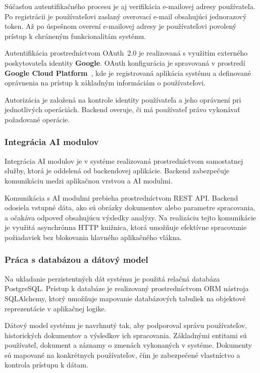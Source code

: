 Súčasťou autentifikačného procesu je aj verifikácia e-mailovej adresy
používateľa. Po registrácii je používateľovi zaslaný overovací e-mail
obsahujúci jednorazový token. Až po úspešnom overení e-mailovej adresy
je používateľovi povolený prístup k chráneným funkcionalitám systému.

Autentifikácia prostredníctvom OAuth~2.0 je realizovaná s využitím
externého poskytovateľa identity \textbf{Google}. OAuth konfigurácia
je spravovaná v prostredí \textbf{Google Cloud Platform}~\cite{gcp_oauth},
kde je registrovaná aplikácia systému a definované oprávnenia na prístup
k základným informáciám o používateľovi.

Autorizácia je založená na kontrole identity používateľa a jeho oprávnení
pri jednotlivých operáciách. Backend overuje, či má používateľ právo
vykonávať požadované operácie.

\subsubsection{Integrácia AI modulov}

Integrácia AI modulov je v systéme realizovaná prostredníctvom samostatnej
služby, ktorá je oddelená od backendovej aplikácie. Backend zabezpečuje komunikáciu medzi
aplikačnou vrstvou a AI modulmi.

Komunikácia s AI modulmi prebieha prostredníctvom REST API. Backend odosiela
vstupné dáta, ako sú obrázky dokumentov alebo parametre spracovania, a
očakáva odpoveď obsahujúcu výsledky analýzy. Na realizáciu tejto komunikácie
je využitá asynchrónna HTTP knižnica, ktorá umožňuje efektívne spracovanie
požiadaviek bez blokovania hlavného aplikačného vlákna.

\subsubsection{Práca s databázou a dátový model}

Na ukladanie perzistentných dát systému je použitá relačná databáza
PostgreSQL. Prístup k databáze je realizovaný prostredníctvom ORM nástroja
SQLAlchemy, ktorý umožňuje mapovanie databázových tabuliek na objektové
reprezentácie v aplikačnej logike.

Dátový model systému je navrhnutý tak, aby podporoval správu používateľov,
historických dokumentov a výsledkov ich spracovania. Základnými entitami
sú používateľ, dokument a záznamy o zmenách vykonaných v systéme.
Dokumenty sú mapované na konkrétnych používateľov, čím je zabezpečené
vlastníctvo a kontrola prístupu k dátam.

